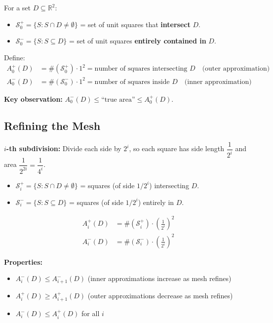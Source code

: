 \documentclass[11pt]{report}
\newcommand{\R}{\mathbb{R}}
\begin{document}
\begin{definition}[0-th Approximation]
For a set $D \subseteq \R^2$:
\begin{itemize}
    \item $\mathcal{S}_0^+ = \{ S : S \cap D \neq \emptyset \}$ = set of unit squares that \textbf{intersect} $D$.
    \item $\mathcal{S}_0^- = \{ S : S \subseteq D \}$ = set of unit squares \textbf{entirely contained in} $D$.
\end{itemize}

Define:
\begin{align*}
A_0^+(D) &= \#(\mathcal{S}_0^+) \cdot 1^2 = \text{number of squares intersecting } D \quad \text{(outer approximation)} \\
A_0^-(D) &= \#(\mathcal{S}_0^-) \cdot 1^2 = \text{number of squares inside } D \quad \text{(inner approximation)}
\end{align*}
\end{definition}

\textbf{Key observation:} $A_0^-(D) \leq \text{``true area''} \leq A_0^+(D)$.

\subsection*{Refining the Mesh}

\textbf{$i$-th subdivision:} Divide each side by $2^i$, so each square has side length $\dfrac{1}{2^i}$ and area $\dfrac{1}{2^{2i}} = \dfrac{1}{4^i}$.

\begin{definition}[$i$-th Approximation]
\begin{itemize}
    \item $\mathcal{S}_i^+ = \{ S : S \cap D \neq \emptyset \}$ = squares (of side $1/2^i$) intersecting $D$.
    \item $\mathcal{S}_i^- = \{ S : S \subseteq D \}$ = squares (of side $1/2^i$) entirely in $D$.
\end{itemize}

\begin{align*}
A_i^+(D) &= \#(\mathcal{S}_i^+) \cdot \left( \frac{1}{2^i} \right)^2 \\
A_i^-(D) &= \#(\mathcal{S}_i^-) \cdot \left( \frac{1}{2^i} \right)^2
\end{align*}
\end{definition}

\textbf{Properties:}
\begin{itemize}
    \item $A_i^-(D) \leq A_{i+1}^-(D)$ \quad (inner approximations increase as mesh refines)
    \item $A_i^+(D) \geq A_{i+1}^+(D)$ \quad (outer approximations decrease as mesh refines)
    \item $A_i^-(D) \leq A_i^+(D)$ for all $i$
\end{itemize}
\end{document}
